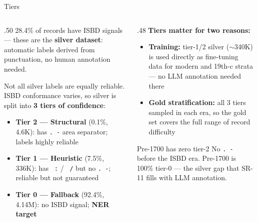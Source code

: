 \documentclass[xcolor,aspectratio=169,compress]{beamer}
\begin{document}
\begin{frame}{Tiers}
  \small
  \begin{columns}
    \begin{column}{.50\textwidth}
      28.4\% of records have ISBD signals --- these are the \textbf{silver dataset}: automatic labels derived from punctuation, no human annotation needed.
      \smallskip

      Not all silver labels are equally reliable. ISBD conformance varies, so silver is split into \textbf{3 tiers of confidence}:
      \begin{itemize}\setlength{\itemsep}{3pt}
        \item \textbf{Tier 2 --- Structural} (0.1\%, 4.6K): has \texttt{. -} area separator; labels highly reliable
        \item \textbf{Tier 1 --- Heuristic} (7.5\%, 336K): has \texttt{ :} / \texttt{ /} but no \texttt{. -}; reliable but not guaranteed
        \item \textbf{Tier 0 --- Fallback} (92.4\%, 4.14M): no ISBD signal; \textbf{NER target}
      \end{itemize}
    \end{column}
    \begin{column}{.48\textwidth}
      \textbf{Tiers matter for two reasons:}
      \begin{itemize}\setlength{\itemsep}{3pt}
        \item \textbf{Training:} tier-1/2 silver ($\sim$340K) is used directly as fine-tuning data for modern and 19th-c strata --- no LLM annotation needed there
        \item \textbf{Gold stratification:} all 3 tiers sampled in each era, so the gold set covers the full range of record difficulty
      \end{itemize}
      \smallskip
      \begin{alertblock}{Pre-1700 has zero tier-2}
        No \texttt{. -} before the ISBD era.
        Pre-1700 is 100\% tier-0 --- the silver gap that SR-11 fills with LLM annotation.
      \end{alertblock}
    \end{column}
  \end{columns}
\end{frame}
\end{document}
